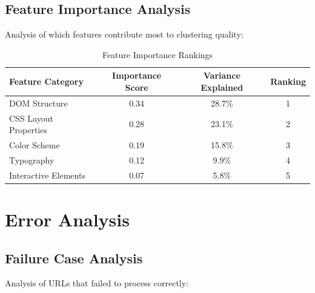 
\subsection{Feature Importance Analysis}
\label{subsec:feature-importance}

Analysis of which features contribute most to clustering quality:

\begin{table}[htbp]
    \centering
    \caption{Feature Importance Rankings}
    \label{tab:feature-importance}
    \begin{tabular}{|l|c|c|c|}
        \hline
        \textbf{Feature Category} & \textbf{Importance Score} & \textbf{Variance Explained} & \textbf{Ranking} \\
        \hline
        DOM Structure & 0.34 & 28.7\% & 1 \\
        CSS Layout Properties & 0.28 & 23.1\% & 2 \\
        Color Scheme & 0.19 & 15.8\% & 3 \\
        Typography & 0.12 & 9.9\% & 4 \\
        Interactive Elements & 0.07 & 5.8\% & 5 \\
        \hline
    \end{tabular}
\end{table}

\section{Error Analysis}
\label{sec:error-analysis}

\subsection{Failure Case Analysis}
\label{subsec:failure-cases}

Analysis of URLs that failed to process correctly:

